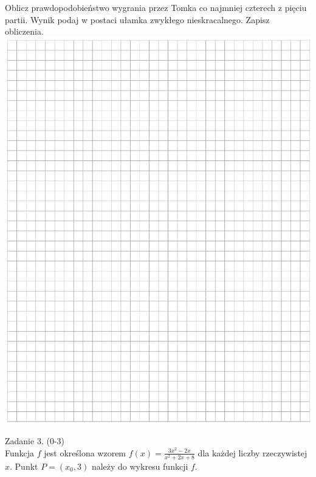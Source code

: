 \documentclass[10pt]{article}
\begin{document}
Oblicz prawdopodobieństwo wygrania przez Tomka co najmniej czterech z pięciu partii. Wynik podaj w postaci ułamka zwykłego nieskracalnego. Zapisz obliczenia.\\
\includegraphics[max width=\textwidth, center]{2024_11_21_f1ecc00f5c4ab21f0d04g-05}

Zadanie 3. (0-3)\\
Funkcja \(f\) jest określona wzorem \(f(x)=\frac{3 x^{2}-2 x}{x^{2}+2 x+8}\) dla każdej liczby rzeczywistej \(x\). Punkt \(P=\left(x_{0}, 3\right)\) należy do wykresu funkcji \(f\).
\end{document}
